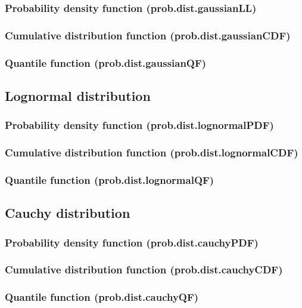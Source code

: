 \documentclass{article}
\theoremstyle{definition}
\begin{document}
\subsubsection{Probability density function (prob.dist.gaussianLL)}
\subsubsection{Cumulative distribution function (prob.dist.gaussianCDF)}
\subsubsection{Quantile function (prob.dist.gaussianQF)}

\subsection{Lognormal distribution}
\subsubsection{Probability density function (prob.dist.lognormalPDF)}
\subsubsection{Cumulative distribution function (prob.dist.lognormalCDF)}
\subsubsection{Quantile function (prob.dist.lognormalQF)}

\subsection{Cauchy distribution}
\subsubsection{Probability density function (prob.dist.cauchyPDF)}
\subsubsection{Cumulative distribution function (prob.dist.cauchyCDF)}
\subsubsection{Quantile function (prob.dist.cauchyQF)}
\end{document}
